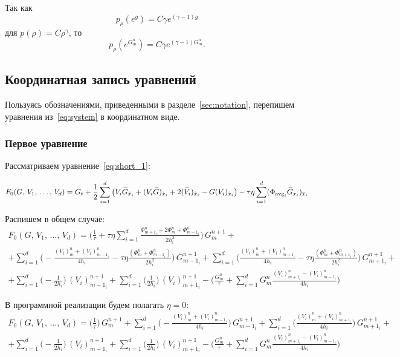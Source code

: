 Так как
\begin{equation*}
    p_\rho (e^g) = C \gamma e^{(\gamma - 1) g}
\end{equation*}
для $p (\rho) = C \rho^\gamma$, то
\begin{equation*}
    p_\rho (e^{G^n_m}) = C \gamma e^{(\gamma - 1) G^n_m}.
\end{equation*}




\subsection{Координатная запись уравнений}
Пользуясь обозначениями, приведенными в разделе~\ref{sec:notation}, перепишем уравнения из~\eqref{eq:system} в координатном виде.

\subsubsection{Первое уравнение}
Рассматриваем уравнение~\eqref{eq:short_1}: 

\begin{equation*} 
F_0 (G, \, V_1, \, \ldots, \, V_d) = G_t
+
\frac{1}{2} \sum_{i = 1}^{d} \big( V_i \widehat{G}_{\mathring{x}_i} + (V_i \widehat{G})_{\mathring{x}_i} + 2 (\widehat{V}_i)_{\mathring{x}_i} - G (V_i)_{\mathring{x}_i} \big)
-
\tau \eta \sum_{i = 1}^{d} (\Phi_{\operatorname{avg}_i} \widehat{G}_{x_i})_{\overline{x}_i}
\end{equation*}

Распишем в общем случае:
\begin{multline*}
F_0 (G, \, V_1, \, \ldots, \, V_d) = 
\bigg( \frac{1}{\tau} + \tau \eta \sum_{i = 1}^{d} \frac{\Phi^n_{m + 1_i} + 2 \Phi^n_m + \Phi^n_{m - 1_i}}{2 h_i^2} \bigg) \, G^{n+1}_m
+ \\ +
\sum_{i = 1}^{d} \bigg( - \frac{(V_i)^n_m + (V_i)^n_{m - 1_i}}{4 h_i} - \tau \eta \frac{(\Phi^n_m + \Phi^n_{m - 1_i})}{2 h_i^2} \bigg) \, G^{n+1}_{m - 1_i}
+
\sum_{i = 1}^{d} \bigg( \frac{(V_i)^n_m + (V_i)^n_{m + 1_i}}{4 h_i} - \tau \eta \frac{(\Phi^n_m + \Phi^n_{m + 1_i})}{2 h_i^2} \bigg) \, G^{n+1}_{m + 1_i}
+ \\ +
\sum_{i = 1}^{d} \bigg( - \frac{1}{2 h_i} \bigg) \, (V_i)^{n+1}_{m - 1_i}
+
\sum_{i = 1}^{d} \bigg( \frac{1}{2 h_i} \bigg) \, (V_i)^{n+1}_{m + 1_i}
-
\bigg( \frac{G^n_m}{\tau} + \sum_{i = 1}^{d} G^n_m \frac{(V_i)^n_{m + 1_i} - (V_i)^n_{m - 1_i}}{4 h_i} \bigg)
\end{multline*}

В программной реализации будем полагать $\eta = 0$:
\begin{multline*}
F_0 (G, \, V_1, \, \ldots, \, V_d) = 
\bigg( \frac{1}{\tau} \bigg) \, G^{n+1}_m
+
\sum_{i = 1}^{d} \bigg( - \frac{(V_i)^n_m + (V_i)^n_{m - 1_i}}{4 h_i} \bigg) \, G^{n+1}_{m - 1_i}
+
\sum_{i = 1}^{d} \bigg(   \frac{(V_i)^n_m + (V_i)^n_{m + 1_i}}{4 h_i} \bigg) \, G^{n+1}_{m + 1_i}
+ \\ +
\sum_{i = 1}^{d} \bigg( - \frac{1}{2 h_i} \bigg) \, (V_i)^{n+1}_{m - 1_i}
+
\sum_{i = 1}^{d} \bigg( \frac{1}{2 h_i} \bigg) \, (V_i)^{n+1}_{m + 1_i}
-
\bigg( \frac{G^n_m}{\tau} + \sum_{i = 1}^{d} G^n_m \frac{(V_i)^n_{m + 1_i} - (V_i)^n_{m - 1_i}}{4 h_i} \bigg)
\end{multline*}

